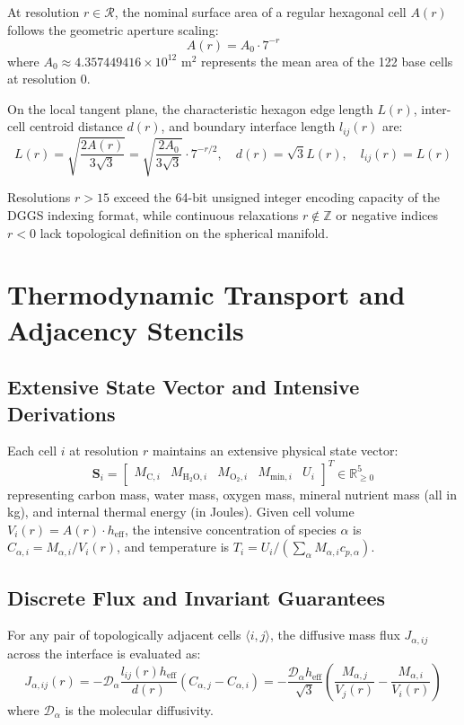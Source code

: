 \documentclass[11pt,a4paper]{article}
\begin{document}
At resolution $r \in \mathcal{R}$, the nominal surface area of a regular hexagonal cell $A(r)$ follows the geometric aperture scaling:
\begin{equation}
A(r) = A_0 \cdot 7^{-r}
\end{equation}
where $A_0 \approx 4.357449416 \times 10^{12} \text{ m}^2$ represents the mean area of the 122 base cells at resolution $0$.

On the local tangent plane, the characteristic hexagon edge length $L(r)$, inter-cell centroid distance $d(r)$, and boundary interface length $l_{ij}(r)$ are:
\begin{equation}
L(r) = \sqrt{\frac{2 A(r)}{3\sqrt{3}}} = \sqrt{\frac{2 A_0}{3\sqrt{3}}} \cdot 7^{-r/2}, \quad d(r) = \sqrt{3} L(r), \quad l_{ij}(r) = L(r)
\end{equation}

Resolutions $r > 15$ exceed the 64-bit unsigned integer encoding capacity of the DGGS indexing format, while continuous relaxations $r \notin \mathbb{Z}$ or negative indices $r < 0$ lack topological definition on the spherical manifold.

\section{Thermodynamic Transport and Adjacency Stencils}

\subsection{Extensive State Vector and Intensive Derivations}
Each cell $i$ at resolution $r$ maintains an extensive physical state vector:
\begin{equation}
\mathbf{S}_i = \begin{bmatrix} M_{\text{C}, i} & M_{\text{H}_2\text{O}, i} & M_{\text{O}_2, i} & M_{\text{min}, i} & U_i \end{bmatrix}^T \in \mathbb{R}^5_{\ge 0}
\end{equation}
representing carbon mass, water mass, oxygen mass, mineral nutrient mass (all in kg), and internal thermal energy (in Joules). Given cell volume $V_i(r) = A(r) \cdot h_{\text{eff}}$, the intensive concentration of species $\alpha$ is $C_{\alpha, i} = M_{\alpha, i} / V_i(r)$, and temperature is $T_i = U_i / (\sum_\alpha M_{\alpha, i} c_{p, \alpha})$.

\subsection{Discrete Flux and Invariant Guarantees}
For any pair of topologically adjacent cells $\langle i, j \rangle$, the diffusive mass flux $J_{\alpha, ij}$ across the interface is evaluated as:
\begin{equation}
J_{\alpha, ij}(r) = -\mathcal{D}_\alpha \frac{l_{ij}(r) h_{\text{eff}}}{d(r)} \left( C_{\alpha, j} - C_{\alpha, i} \right) = -\frac{\mathcal{D}_\alpha h_{\text{eff}}}{\sqrt{3}} \left( \frac{M_{\alpha, j}}{V_j(r)} - \frac{M_{\alpha, i}}{V_i(r)} \right)
\end{equation}
where $\mathcal{D}_\alpha$ is the molecular diffusivity.
\end{document}
